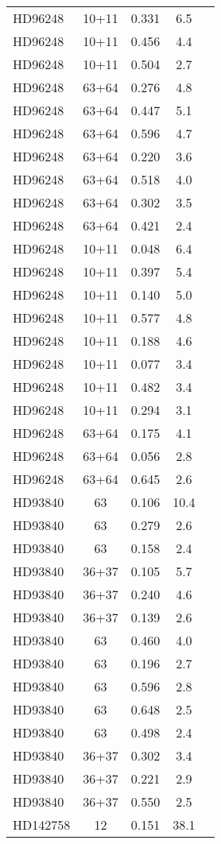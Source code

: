 \begin{table*}
\begin{tabular}{l c c c c}
HD96248 & 10+11 & 0.331 & 6.5\\ 
HD96248 & 10+11 & 0.456 & 4.4\\ 
HD96248 & 10+11 & 0.504 & 2.7\\ 
HD96248 & 63+64 & 0.276 & 4.8\\ 
HD96248 & 63+64 & 0.447 & 5.1\\ 
HD96248 & 63+64 & 0.596 & 4.7\\ 
HD96248 & 63+64 & 0.220 & 3.6\\ 
HD96248 & 63+64 & 0.518 & 4.0\\ 
HD96248 & 63+64 & 0.302 & 3.5\\ 
HD96248 & 63+64 & 0.421 & 2.4\\ 
HD96248 & 10+11 & 0.048 & 6.4\\ 
HD96248 & 10+11 & 0.397 & 5.4\\ 
HD96248 & 10+11 & 0.140 & 5.0\\ 
HD96248 & 10+11 & 0.577 & 4.8\\ 
HD96248 & 10+11 & 0.188 & 4.6\\ 
HD96248 & 10+11 & 0.077 & 3.4\\ 
HD96248 & 10+11 & 0.482 & 3.4\\ 
HD96248 & 10+11 & 0.294 & 3.1\\ 
HD96248 & 63+64 & 0.175 & 4.1\\ 
HD96248 & 63+64 & 0.056 & 2.8\\ 
HD96248 & 63+64 & 0.645 & 2.6\\ 
\hline
HD93840 & 63 & 0.106 & 10.4\\ 
HD93840 & 63 & 0.279 & 2.6\\ 
HD93840 & 63 & 0.158 & 2.4\\ 
HD93840 & 36+37 & 0.105 & 5.7\\ 
HD93840 & 36+37 & 0.240 & 4.6\\ 
HD93840 & 36+37 & 0.139 & 2.6\\ 
HD93840 & 63 & 0.460 & 4.0\\ 
HD93840 & 63 & 0.196 & 2.7\\ 
HD93840 & 63 & 0.596 & 2.8\\ 
HD93840 & 63 & 0.648 & 2.5\\ 
HD93840 & 63 & 0.498 & 2.4\\ 
HD93840 & 36+37 & 0.302 & 3.4\\ 
HD93840 & 36+37 & 0.221 & 2.9\\ 
HD93840 & 36+37 & 0.550 & 2.5\\ 
\hline
HD142758 & 12 & 0.151 & 38.1\\ 

\end{tabular}
\end{table*}

